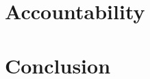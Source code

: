 \documentclass[11pt]{diazessay} %
\begin{document}

\section*{Accountability}



\section*{Conclusion}






\end{document}
